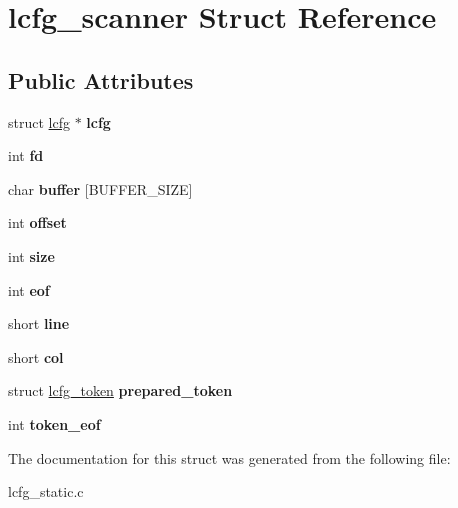 \hypertarget{structlcfg__scanner}{\section{lcfg\+\_\+scanner Struct Reference}
\label{structlcfg__scanner}
}
\subsection*{Public Attributes}
\begin{DoxyCompactItemize}
\item 
\hypertarget{structlcfg__scanner_af937d1611322ec0f7639e584df7b96c0}{struct \hyperlink{structlcfg}{lcfg} $\ast$ {\bfseries lcfg}}\label{structlcfg__scanner_af937d1611322ec0f7639e584df7b96c0}

\item 
\hypertarget{structlcfg__scanner_ac7f8214cb39c68f07276afa07a68d08a}{int {\bfseries fd}}\label{structlcfg__scanner_ac7f8214cb39c68f07276afa07a68d08a}

\item 
\hypertarget{structlcfg__scanner_a394a3bf2df622e0e698884f06e8d68c8}{char {\bfseries buffer} \mbox{[}B\+U\+F\+F\+E\+R\+\_\+\+S\+I\+Z\+E\mbox{]}}\label{structlcfg__scanner_a394a3bf2df622e0e698884f06e8d68c8}

\item 
\hypertarget{structlcfg__scanner_a25753fe2275eba8bee3f994c5af1a192}{int {\bfseries offset}}\label{structlcfg__scanner_a25753fe2275eba8bee3f994c5af1a192}

\item 
\hypertarget{structlcfg__scanner_aa3da8cfe3f1a26f13bd2d3ae5e080393}{int {\bfseries size}}\label{structlcfg__scanner_aa3da8cfe3f1a26f13bd2d3ae5e080393}

\item 
\hypertarget{structlcfg__scanner_aa7b1358559f5608fcbca98936cdd9cdb}{int {\bfseries eof}}\label{structlcfg__scanner_aa7b1358559f5608fcbca98936cdd9cdb}

\item 
\hypertarget{structlcfg__scanner_a42442806f225004bfb3e00c05ab5e37a}{short {\bfseries line}}\label{structlcfg__scanner_a42442806f225004bfb3e00c05ab5e37a}

\item 
\hypertarget{structlcfg__scanner_ae0d696370027e1104574e62b7603c2b4}{short {\bfseries col}}\label{structlcfg__scanner_ae0d696370027e1104574e62b7603c2b4}

\item 
\hypertarget{structlcfg__scanner_ab0350457b83dd5b4d9720cfde3266144}{struct \hyperlink{structlcfg__token}{lcfg\+\_\+token} {\bfseries prepared\+\_\+token}}\label{structlcfg__scanner_ab0350457b83dd5b4d9720cfde3266144}

\item 
\hypertarget{structlcfg__scanner_a3975f5b241ca65656110c96f7f009d02}{int {\bfseries token\+\_\+eof}}\label{structlcfg__scanner_a3975f5b241ca65656110c96f7f009d02}

\end{DoxyCompactItemize}


The documentation for this struct was generated from the following file\+:\begin{DoxyCompactItemize}
\item 
lcfg\+\_\+static.\+c\end{DoxyCompactItemize}
